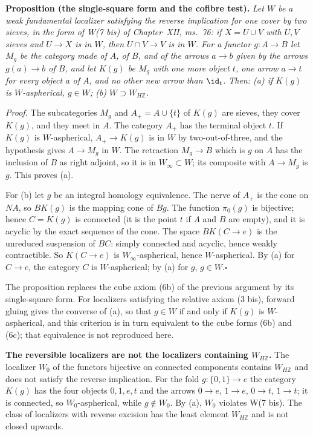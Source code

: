 \textbf{Proposition (the single-square form and the cofibre test).}\ours
\textit{Let $W$ be a weak fundamental localizer satisfying the reverse implication for one cover by two sieves, in the form of W(7 bis) of Chapter~XII, ms.~76: if $X=U\cup V$ with $U,V$ sieves and $U\to X$ is in $W$, then $U\cap V\to V$ is in $W$. For a functor $g:A\to B$ let $M_g$ be the category made of $A$, of $B$, and of the arrows $a\to b$ given by the arrows $g(a)\to b$ of $B$, and let $K(g)$ be $M_g$ with one more object $t$, one arrow $a\to t$ for every object $a$ of $A$, and no other new arrow than $\id_t$. Then: (a) if $K(g)$ is $W$-aspherical, $g\in W$; (b) $W\supset W_{H\mathbb Z}$.}

\textit{Proof.}
The subcategories $M_g$ and $A_+=A\cup\{t\}$ of $K(g)$ are sieves, they cover $K(g)$, and they meet in $A$. The category $A_+$ has the terminal object $t$. If $K(g)$ is $W$-aspherical, $A_+\to K(g)$ is in $W$ by two-out-of-three, and the hypothesis gives $A\to M_g$ in $W$. The retraction $M_g\to B$ which is $g$ on $A$ has the inclusion of $B$ as right adjoint, so it is in $W_\infty\subset W$; its composite with $A\to M_g$ is $g$. This proves (a).

For (b) let $g$ be an integral homology equivalence. The nerve of $A_+$ is the cone on $NA$, so $BK(g)$ is the mapping cone of $Bg$. The function $\pi_0(g)$ is bijective; hence $C=K(g)$ is connected (it is the point $t$ if $A$ and $B$ are empty), and it is acyclic by the exact sequence of the cone. The space $BK(C\to e)$ is the unreduced suspension of $BC$: simply connected and acyclic, hence weakly contractible. So $K(C\to e)$ is $W_\infty$-aspherical, hence $W$-aspherical. By (a) for $C\to e$, the category $C$ is $W$-aspherical; by (a) for $g$, $g\in W$.\hfill$\square$

The proposition replaces the cube axiom (6b) of the previous argument by its single-square form. For localizers satisfying the relative axiom (3 bis), forward gluing gives the converse of (a), so that $g\in W$ if and only if $K(g)$ is $W$-aspherical, and this criterion is in turn equivalent to the cube forms (6b) and (6c); that equivalence is not reproduced here.

\textbf{The reversible localizers are not the localizers containing $W_{H\mathbb Z}$.}\ours
The localizer $W_0$ of the functors bijective on connected components contains $W_{H\mathbb Z}$ and does not satisfy the reverse implication. For the fold $g:\{0,1\}\to e$ the category $K(g)$ has the four objects $0,1,e,t$ and the arrows $0\to e$, $1\to e$, $0\to t$, $1\to t$; it is connected, so $W_0$-aspherical, while $g\notin W_0$. By (a), $W_0$ violates W(7 bis). The class of localizers with reverse excision has the least element $W_{H\mathbb Z}$ and is not closed upwards.

